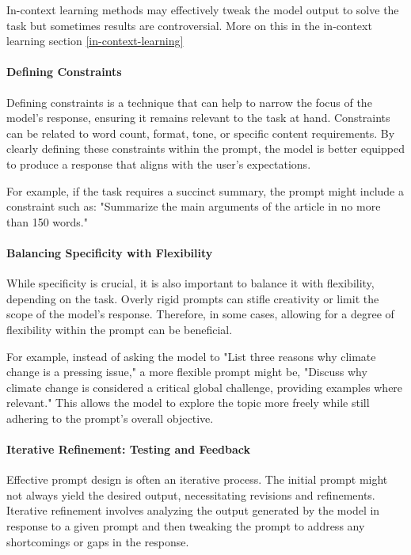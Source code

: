 In-context learning methods may effectively tweak the model output to solve the task but sometimes results are controversial. More on this in the in-context learning section \ref{in-context-learning}

\paragraph{Defining Constraints}

Defining constraints is a technique that can help to narrow the focus of the model's response, ensuring it remains relevant to the task at hand. Constraints can be related to word count, format, tone, or specific content requirements. By clearly defining these constraints within the prompt, the model is better equipped to produce a response that aligns with the user's expectations.

For example, if the task requires a succinct summary, the prompt might include a constraint such as: "Summarize the main arguments of the article in no more than 150 words."

\paragraph{Balancing Specificity with Flexibility}

While specificity is crucial, it is also important to balance it with flexibility, depending on the task. Overly rigid prompts can stifle creativity or limit the scope of the model's response. Therefore, in some cases, allowing for a degree of flexibility within the prompt can be beneficial.

For example, instead of asking the model to "List three reasons why climate change is a pressing issue," a more flexible prompt might be, "Discuss why climate change is considered a critical global challenge, providing examples where relevant." This allows the model to explore the topic more freely while still adhering to the prompt's overall objective.

\paragraph{Iterative Refinement: Testing and Feedback}

Effective prompt design is often an iterative process. The initial prompt might not always yield the desired output, necessitating revisions and refinements. Iterative refinement involves analyzing the output generated by the model in response to a given prompt and then tweaking the prompt to address any shortcomings or gaps in the response.

